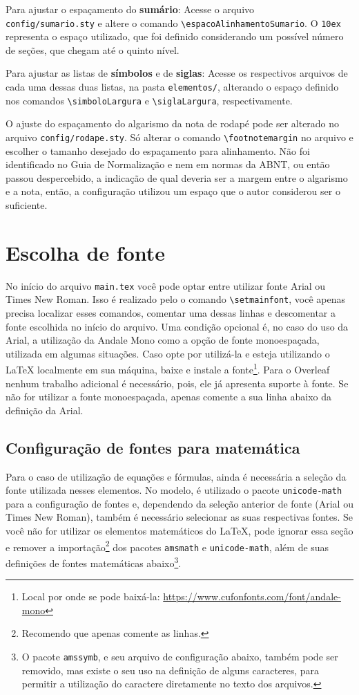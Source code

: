 Para ajustar o espaçamento do \textbf{sumário}: Acesse o arquivo \\\texttt{config/sumario.sty} e altere o comando \verb|\espacoAlinhamentoSumario|. O \texttt{10ex} representa o espaço utilizado, que foi definido considerando um possível número de seções, que chegam até o quinto nível.

Para ajustar as listas de \textbf{símbolos} e de \textbf{siglas}: Acesse os respectivos arquivos de cada uma dessas duas listas, na pasta \texttt{elementos/}, alterando o espaço definido nos comandos \verb|\simboloLargura| e \verb|\siglaLargura|, respectivamente.

O ajuste do espaçamento do algarismo da nota de rodapé pode ser alterado no arquivo \texttt{config/rodape.sty}. Só alterar o comando \verb|\footnotemargin| no arquivo e escolher o tamanho desejado do espaçamento para alinhamento. Não foi identificado no Guia de Normalização e nem em normas da ABNT, ou então passou despercebido, a indicação de qual deveria ser a margem entre o algarismo e a nota, então, a configuração utilizou um espaço que o autor considerou ser o suficiente.

\section{Escolha de fonte}
No início do arquivo \texttt{main.tex} você pode optar entre utilizar fonte Arial ou Times New Roman. Isso é realizado pelo o comando \verb|\setmainfont|, você apenas precisa localizar esses comandos, comentar uma dessas linhas e descomentar a fonte escolhida no início do arquivo. Uma condição opcional é, no caso do uso da Arial, a utilização da Andale Mono como a opção de fonte monoespaçada, utilizada em algumas situações. Caso opte por utilizá-la e esteja utilizando o \LaTeX{} localmente em sua máquina, baixe e instale a fonte\footnote{Local por onde se pode baixá-la: \url{https://www.cufonfonts.com/font/andale-mono}}. Para o Overleaf nenhum trabalho adicional é necessário, pois, ele já apresenta suporte à fonte. Se não for utilizar a fonte monoespaçada, apenas comente a sua linha abaixo da definição da Arial.

\subsection{Configuração de fontes para matemática}
Para o caso de utilização de equações e fórmulas, ainda é necessária a seleção da fonte utilizada nesses elementos. No modelo, é utilizado o pacote \texttt{unicode-math} para a configuração de fontes e, dependendo da seleção anterior de fonte (Arial ou Times New Roman), também é necessário selecionar as suas respectivas fontes. Se você não for utilizar os elementos matemáticos do \LaTeX{}, pode ignorar essa seção e remover a importação\footnote{Recomendo que apenas comente as linhas.} dos pacotes \texttt{amsmath} e \texttt{unicode-math}, além de suas definições de fontes matemáticas abaixo\footnote{O pacote \texttt{amssymb}, e seu arquivo de configuração abaixo, também pode ser removido, mas existe o seu uso na definição de alguns caracteres, para permitir a utilização do caractere diretamente no texto dos arquivos.}.

